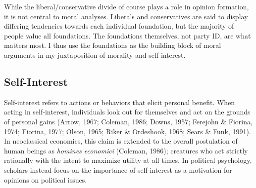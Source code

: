 \documentclass[12pt,econ]{sources/authesis}
\begin{document}
While the liberal/conservative divide of course plays a role in opinion formation, it is not central to moral analyses. Liberals and conservatives are said to display differing tendencies towards each individual foundation, but the majority of people value all foundations. The foundations themselves, not party ID, are what matters most. I thus use the foundations as the building block of moral arguments in my juxtaposition of morality and self-interest.

\hypertarget{framing-theory-self_interest}{%
\subsection{Self-Interest}\label{framing-theory-self_interest}}

Self-interest refers to actions or behaviors that elicit personal benefit. When acting in self-interest, individuals look out for themselves and act on the grounds of personal gains (Arrow, 1967; Coleman, 1986; Downs, 1957; Ferejohn \& Fiorina, 1974; Fiorina, 1977; Olson, 1965; Riker \& Ordeshook, 1968; Sears \& Funk, 1991). In neoclassical economics, this claim is extended to the overall postulation of human beings as \textit{homines economici} (Coleman, 1986); creatures who act strictly rationally with the intent to maximize utility at all times. In political psychology, scholars instead focus on the importance of self-interest as a motivation for opinions on political issues.
\end{document}

